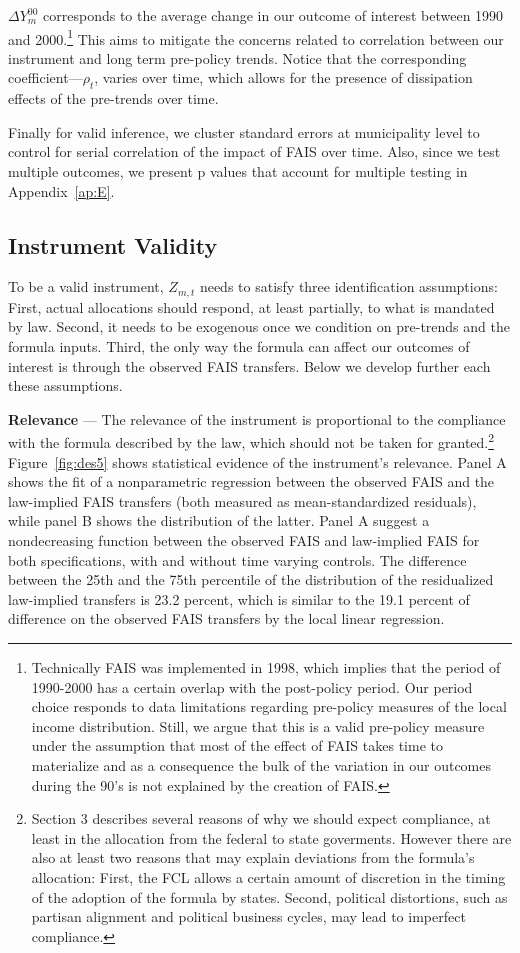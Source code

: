 \documentclass[dv_diss_main.tex]{subfiles}
\begin{document}
 $\Delta Y_m^{00}$  corresponds to the average change in our outcome of interest between 1990 and 2000.\footnote{Technically FAIS was implemented in 1998, which implies that the period of 1990-2000 has a certain overlap with the post-policy period. Our period choice responds to data limitations regarding pre-policy measures of the local income distribution. Still, we argue that this is a valid pre-policy measure under the assumption that most of the effect of FAIS takes time to materialize and as a consequence the bulk of the variation in our outcomes during the 90’s is not explained by the creation of FAIS.}
 This aims to mitigate the concerns related to correlation between our instrument and long term pre-policy trends. Notice that the corresponding  coefficient---$\rho_t$, varies over time, which allows for the presence of dissipation effects of the pre-trends over time. 


Finally for valid inference, we cluster standard errors at municipality level to control for serial correlation of the impact of FAIS over time. Also, since we test multiple outcomes, we present p values that account for multiple testing in Appendix~\ref{ap:E}. 

\subsection{Instrument Validity} \label{subsec:validity}

To be a valid instrument, $Z_{m,t}$ needs to satisfy three identification assumptions: First, actual allocations should respond, at least partially, to what is mandated by law. Second, it needs to be exogenous once we condition on pre-trends and the formula inputs. Third, the only way the formula can affect our outcomes of interest is through the observed FAIS transfers. Below we develop further each these assumptions.

\textbf{Relevance }— The relevance of the instrument is proportional to the compliance with the formula described by the law, which should not be taken for granted.\footnote{Section 3 describes several reasons of why we should expect compliance, at least in the allocation from the federal to state goverments. However there are also at least two reasons that may explain deviations from the formula's allocation: First, the FCL allows a certain amount of discretion in the timing of the adoption of the formula by states. Second, political distortions, such as partisan alignment and political business cycles, may lead to imperfect compliance.} {Figure}~\ref{fig:des5} shows statistical evidence of the instrument’s relevance. Panel A shows the fit of a nonparametric regression between the observed FAIS and the law-implied FAIS transfers (both measured as mean-standardized residuals), while panel B shows the distribution of the latter. Panel A suggest a nondecreasing function between the observed FAIS and law-implied FAIS for both specifications, with and without time varying controls. The difference between the 25th and the 75th percentile of the distribution of the residualized law-implied transfers is 23.2 percent, which is similar to the 19.1 percent of difference on the observed FAIS transfers by the local linear regression.
\end{document}
